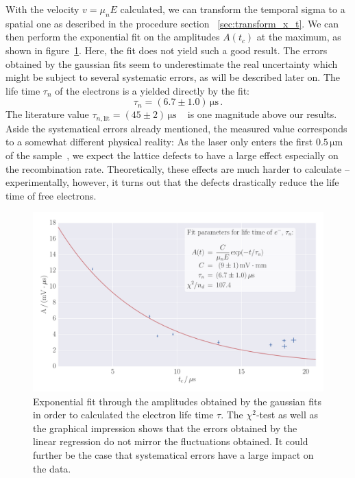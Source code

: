 With the velocity $v = \mu_n E$ calculated, we can transform 
the temporal sigma to a spatial one as described in the procedure section~%
\ref{sec:transform_x_t}. We can then perform the exponential fit on 
the amplitudes $A(t_c)$ at the maximum, as shown in figure~\ref{fig:h_s_tau_d}.
Here, the fit does not yield such a good result. The errors obtained 
by the gaussian fits seem to underestimate the real uncertainty 
which might be subject to several systematic errors, as will be described later on. 
The life time $\tau_n$ of the electrons is a yielded directly by the fit:
\begin{equation}
    \tau_n = (6.7 \pm 1.0)\, \mathrm{\mu s} \, .
\end{equation}
The literature value $\tau_{n, \mathrm{lit}} = (45 \pm 2)\, \mathrm{\mu s}$%
~\cite{staatsexamen}
is one magnitude above our results. Aside the systematical errors already 
mentioned, the measured value corresponds to a somewhat different 
physical reality: As the laser only enters the first $0.5 \, \mathrm{\mu m}$
of the sample~\cite{staatsexamen}, we expect the lattice defects to have 
a large effect especially on the recombination rate. Theoretically, 
these effects are much harder to calculate -- experimentally, however, 
it turns out that the defects drastically reduce the life time of free electrons. 

\begin{figure}
    \includegraphics[width=1.0\textwidth]{figures/haynes_shockley_tau_d}
    \caption{
        Exponential fit through the amplitudes obtained by the gaussian fits 
        in order to calculated the electron life time $\tau$. The $\chi^2$-test 
        as well as the graphical impression shows that the errors obtained by the 
        linear regression do not mirror the fluctuations obtained. It could 
        further be the case that systematical errors have a large impact on the 
        data. 
        }
    \label{fig:h_s_tau_d}
\end{figure}

